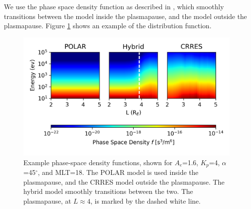 We use the phase space density function as described in \cite{Golden2010}, which smoothly transitions between the \cite{Bell2002} model inside the plasmapause, and the \cite{Bortnik2007} model outside the plasmapause. Figure \ref{fig:phase_space_density} shows an example of the distribution function.

\begin{figure}[ht]
\begin{center}
\includegraphics{Figures/psd.png}
\end{center}
\caption[Phase-space density functions]{Example phase-space density functions, shown for $A_e$=1.6, $K_p$=4, $\alpha$=45$^\circ$, and MLT=18. The POLAR model is used inside the plasmapause, and the CRRES model outside the plasmapause. The hybrid model smoothly transitions between the two. The plasmapause, at $L\approx 4$, is marked by the dashed white line.}
\label{fig:phase_space_density}
\end{figure}







